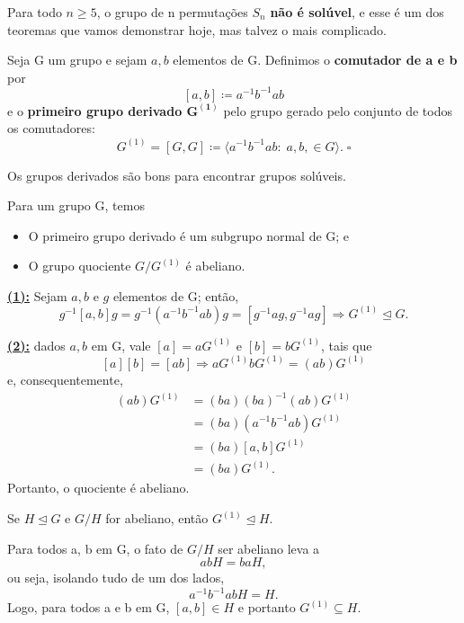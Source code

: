 \documentclass[../algebraIII_notes.tex]{subfiles}
\begin{document}
Para todo \(n\geq 5\), o grupo de n permutações \(S_{n}\) \textbf{não é solúvel}, e esse é um dos teoremas que vamos demonstrar hoje, mas talvez o mais complicado.
\begin{def*}
	Seja G um grupo e sejam \(a, b\) elementos de G. Definimos o \textbf{comutador de a e b} por
	\[
		[a, b]\coloneqq a^{-1}b^{-1}ab
	\]
	e o \textbf{primeiro grupo derivado \(\mathbf{G^{(1)}}\)} pelo grupo gerado pelo conjunto de todos os comutadores:
	\[
		G^{(1)}=[G, G]\coloneqq \langle a^{-1}b^{-1}ab:\; a, b, \in G \rangle. \; \square
	\]
\end{def*}
Os grupos derivados são bons para encontrar grupos solúveis.
\begin{lemma*}
	Para um grupo G, temos
	\begin{itemize}
		\item[1)] O primeiro grupo derivado é um subgrupo normal de G; e
		\item[2)] O grupo quociente \(G/G^{(1)}\) é abeliano.
	\end{itemize}
\end{lemma*}
\begin{proof*}
	\textbf{\underline{(1):}} Sejam \(a, b\) e \(g\) elementos de G; então,
	\[
		g^{-1}[a, b]g = g^{-1}(a^{-1}b^{-1}ab)g = [g^{-1}ag, g^{-1}ag] \Rightarrow G^{(1)}\trianglelefteq G.
	\]

	\textbf{\underline{(2):}} dados \(a, b\) em G, vale \([a]=aG^{(1)}\) e \([b]=bG^{(1)}\), tais que
	\[
		[a][b]=[ab] \Rightarrow aG^{(1)}bG^{(1)} = (ab)G^{(1)}
	\]
	e, consequentemente,
	\begin{align*}
		(ab)G^{(1)} & = (ba)(ba)^{-1}(ab)G^{(1)}    \\
		            & = (ba)(a^{-1}b^{-1}ab)G^{(1)} \\
		            & = (ba)[a, b]G^{(1)}           \\
		            & = (ba)G^{(1)}.
	\end{align*}
	Portanto, o quociente é abeliano. \qedsymbol
\end{proof*}
\begin{lemma*}
	Se \(H\trianglelefteq G\) e \(G/H\) for abeliano, então \(G^{(1)}\trianglelefteq H\).
\end{lemma*}
\begin{proof*}
	Para todos a, b em G, o fato de \(G/H\) ser abeliano leva a
	\[
		abH = baH,
	\]
	ou seja, isolando tudo de um dos lados,
	\[
		a^{-1}b^{-1}abH = H.
	\]
	Logo, para todos a e b em G, \([a, b]\in H\) e portanto \(G^{(1)}\subseteq H\).
\end{proof*}
\end{document}
